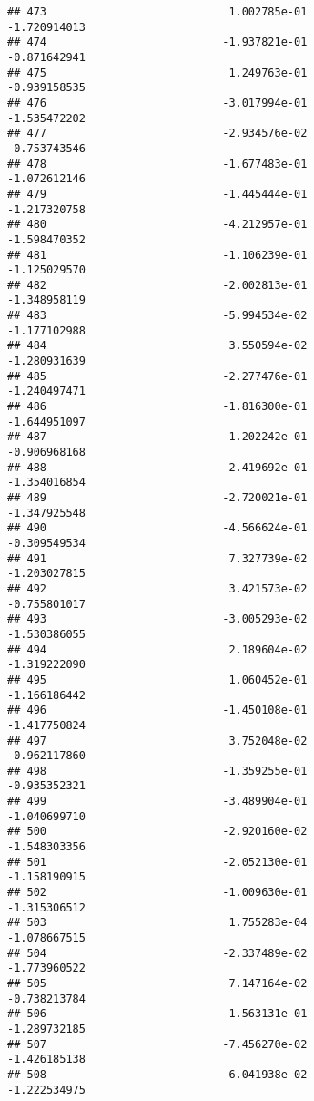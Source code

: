 \documentclass[
]{article}
\begin{document}
\begin{verbatim}
## 473                            1.002785e-01               -1.720914013
## 474                           -1.937821e-01               -0.871642941
## 475                            1.249763e-01               -0.939158535
## 476                           -3.017994e-01               -1.535472202
## 477                           -2.934576e-02               -0.753743546
## 478                           -1.677483e-01               -1.072612146
## 479                           -1.445444e-01               -1.217320758
## 480                           -4.212957e-01               -1.598470352
## 481                           -1.106239e-01               -1.125029570
## 482                           -2.002813e-01               -1.348958119
## 483                           -5.994534e-02               -1.177102988
## 484                            3.550594e-02               -1.280931639
## 485                           -2.277476e-01               -1.240497471
## 486                           -1.816300e-01               -1.644951097
## 487                            1.202242e-01               -0.906968168
## 488                           -2.419692e-01               -1.354016854
## 489                           -2.720021e-01               -1.347925548
## 490                           -4.566624e-01               -0.309549534
## 491                            7.327739e-02               -1.203027815
## 492                            3.421573e-02               -0.755801017
## 493                           -3.005293e-02               -1.530386055
## 494                            2.189604e-02               -1.319222090
## 495                            1.060452e-01               -1.166186442
## 496                           -1.450108e-01               -1.417750824
## 497                            3.752048e-02               -0.962117860
## 498                           -1.359255e-01               -0.935352321
## 499                           -3.489904e-01               -1.040699710
## 500                           -2.920160e-02               -1.548303356
## 501                           -2.052130e-01               -1.158190915
## 502                           -1.009630e-01               -1.315306512
## 503                            1.755283e-04               -1.078667515
## 504                           -2.337489e-02               -1.773960522
## 505                            7.147164e-02               -0.738213784
## 506                           -1.563131e-01               -1.289732185
## 507                           -7.456270e-02               -1.426185138
## 508                           -6.041938e-02               -1.222534975

\end{verbatim}
\end{document}
